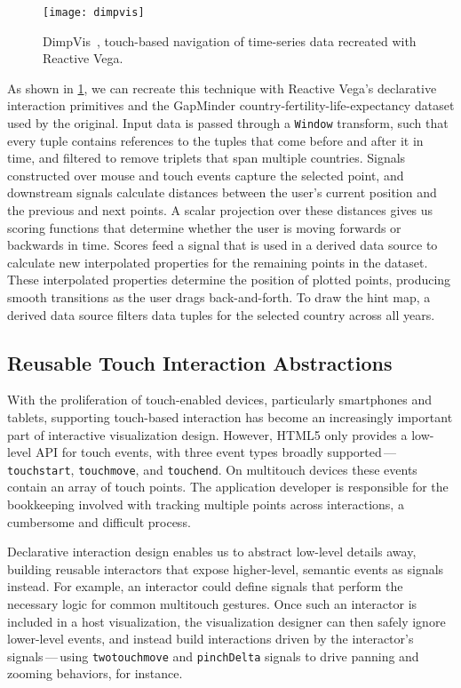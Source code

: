 \begin{figure}[b!]
  \centering
  \texttt{[image: dimpvis]}
  \caption{DimpVis~\cite{kondo:dimpvis}, touch-based navigation of time-series
  data recreated with Reactive Vega.}
  \label{fig:vg:dimpvis}
\end{figure}

As shown in \cref{fig:vg:dimpvis}, we can recreate this technique with Reactive
Vega's declarative interaction primitives and the GapMinder
country-fertility-life-expectancy dataset used by the original. Input data is
passed through a \texttt{Window} transform, such that every tuple contains
references to the tuples that come before and after it in time, and filtered to
remove triplets that span multiple countries. Signals constructed over mouse and
touch events capture the selected point, and downstream signals calculate
distances between the user's current position and the previous and next points.
A scalar projection over these distances gives us scoring functions that
determine whether the user is moving forwards or backwards in time. Scores feed
a signal that is used in a derived data source to calculate new interpolated
properties for the remaining points in the dataset. These interpolated
properties determine the position of plotted points, producing smooth
transitions as the user drags back-and-forth. To draw the hint map, a derived
data source filters data tuples for the selected country across all years.

\vspace{-20pt}

\subsection{Reusable Touch Interaction Abstractions}

\vspace{-7pt}

With the proliferation of touch-enabled devices, particularly smartphones and
tablets, supporting touch-based interaction has become an increasingly important
part of interactive visualization design. However, HTML5 only provides a
low-level API for touch events, with three event types broadly
supported\,---\,\texttt{touchstart}, \texttt{touchmove}, and \texttt{touchend}.
On multitouch devices these events contain an array of touch points. The
application developer is responsible for the bookkeeping involved with tracking
multiple points across interactions, a cumbersome and difficult process.

Declarative interaction design enables us to abstract low-level details away,
building reusable interactors that expose higher-level, semantic events as
signals instead. For example, an interactor could define signals that perform
the necessary logic for common multitouch gestures. Once such an interactor is
included in a host visualization, the visualization designer can then safely
ignore lower-level events, and instead build interactions driven by the
interactor's signals\,---\,using \texttt{twotouchmove} and \texttt{pinchDelta}
signals to drive panning and zooming behaviors, for instance.